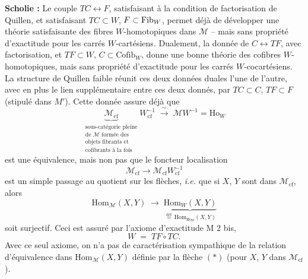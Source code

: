 \noindent\textbf{Scholie :} Le couple $TC \longleftrightarrow F$, satisfaisant à la condition de factorisation de Quillen, et satisfaisant $TC \subset W$, $F \subset \mathrm{Fib}_W$, permet déjà de développer une théorie satisfaisante des fibres $W$-homotopiques dans $\mathcal{M}$ -- mais sans propriété d'exactitude pour les carrés $W$-cartésiens. Dualement, la donnée de $C \longleftrightarrow TF$, avec factorisation, et $TF \subset W$, $C \subset \mathrm{Cofib}_W$, donne une bonne théorie des cofibres $W$-homotopiques, mais sans propriété d'exactitude pour les carrés $W$-cocartésiens. La structure de Quillen faible réunit ces deux données duales l'une de l'autre, avec en plus le lien supplémentaire entre ces deux donnés, par $TC \subset C$, $TF \subset F$ (stipulé dans $M'$). Cette donnée assure déjà que %
\[
\underbrace{\mathcal{M}_{\mathrm{cf}}}_{\substack{\text{sous-catégorie pleine}\\ \text{de $\mathcal{M}$ formée des}\\ \text{objets fibrants et}\\ \text{cofibrants à la fois}}} W_{\mathrm{cf}}^{-1} \;\xrightarrow{\ \sim\ }\; \mathcal{M}W^{-1} = \mathrm{Ho}_W
\]
est une équivalence, mais non pas que le foncteur localisation
\[
\mathcal{M}_{\mathrm{cf}} \longrightarrow \mathcal{M}_{\mathrm{cf}}W_{\mathrm{cf}}^{-1}
\]
est un simple passage au quotient sur les flèches, \textit{i.e.} que si $X$, $Y$ sont dans $\mathcal{M}_{\mathrm{cf}}$, alors
\[
\mathrm{Hom}_{\mathcal{M}}(X, Y) \;\longrightarrow\; \underbrace{\mathrm{Hom}_W(X, Y)}_{\overset{\text{déf}}{=}\,\mathrm{Hom}_{\mathrm{Ho}_W}(X, Y)} \tag*{$(*)$}
\]
soit surjectif. Ceci est assuré par l'axiome d'exactitude M 2 bis,
\[
W \;=\; TF \circ TC.
\]
Avec ce seul axiome, on n'a pas de caractérisation sympathique de la relation d'équivalence dans $\mathrm{Hom}_{\mathcal{M}}(X, Y)$ définie par la flèche $(*)$ (pour $X$, $Y$ dans $\mathcal{M}_{\mathrm{cf}}$).


